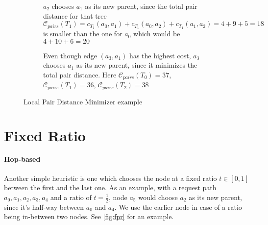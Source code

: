 \documentclass[a4paper, oneside]{discothesis}
\begin{document}
\begin{figure}[H]
\begin{subfigure}[t]{0.5\textwidth}
\centering
{}
\caption{$a_{2}$ chooses $a_{1}$ as its new parent, since the total pair distance for that tree $\mathcal{C}_{pairs}(T_1)=c_{T_1}(a_{0},a_{1})+c_{T_1}(a_{0},a_{2})+c_{T_1}(a_{1},a_{2})=4+9+5=18$ is smaller than the one for $a_{0}$ which would be $4+10+6=20$}
\end{subfigure}
\quad
\begin{subfigure}[t]{0.5\textwidth}
\centering
{}
\caption{Even though edge $(a_{3},a_{1})$ has the highest cost, $a_{3}$ chooses $a_{1}$ as its new parent, since it minimizes the total pair distance. Here $\mathcal{C}_{pairs}(T_0)=37$, $\mathcal{C}_{pairs}(T_1)=36$, $\mathcal{C}_{pairs}(T_2)=38$}
\end{subfigure}
\caption{Local Pair Distance Minimizer example}
\label{fig:lpm}
\end{figure}

\section{Fixed Ratio}\label{alg:fr}

\paragraph{Hop-based}\label{alg:frh}

Another simple heuristic is one which chooses the node at a fixed ratio $t\in[0,1]$ between the first and the last one. As an example, with a request path $a_{0},a_{1},a_{2},a_{3},a_{4}$ and a ratio of $t=\frac{1}{2}$, node $a_{5}$ would choose $a_{2}$ as its new parent, since it's half-way between $a_{0}$ and $a_{4}$. We use the earlier node in case of a ratio being in-between two nodes. See \autoref{fig:fpr} for an example.
\end{document}
